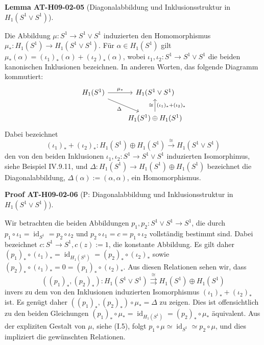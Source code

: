 \documentclass[10pt, letterpaper]{article}
\newcommand{\CustomHeading}[3]{%
  \par\medskip\noindent%
  \textbf{#1 #2} \textnormal{(#3)}.\enskip%
}
\newenvironment{LEM}[2]{\CustomHeading{Lemma}{#1}{#2}}{}
\newenvironment{PROOF}[2]{\CustomHeading{Proof}{#1}{#2}}{}
\begin{document}
\begin{LEM}{AT-H09-02-05}{Diagonalabbildung und Inklusionsstruktur in $H_1\left(S^1 \vee S^1\right)$}
Die Abbildung $\mu: S^1 \longrightarrow S^1 \vee S^1$ induzierten den Homomorphismus $\mu_*: H_1(S^1) \longrightarrow H_1(S^1 \vee S^1)$. Für $\alpha \in H_1\left(S^1\right)$ gilt $\mu_*(\alpha)=\left(\iota_1\right)_*(\alpha)+\left(\iota_2\right)_*(\alpha)$, wobei $\iota_1, \iota_2: S^1 \rightarrow S^1 \vee S^1$ die beiden kanonischen Inklusionen bezeichnen. In anderen Worten, das folgende Diagramm kommutiert:
\[
\begin{tikzcd}
H_1(S^1) \arrow[r, "\mu_*"] \arrow[dr, "\Delta"'] & H_1(S^1 \vee S^1) \\
& H_1(S^1) \oplus H_1(S^1) \arrow[u, "(\iota_1)_* + (\iota_2)_*"', "\cong"]
\end{tikzcd}
\]
Dabei bezeichnet 
$$\left(\iota_1\right)_*+\left(\iota_2\right)_*: H_1\left(S^1\right) \oplus H_1\left(S^1\right) \stackrel{\cong}{\rightarrow} H_1\left(S^1 \vee S^1\right)$$ 
den von den beiden Inklusionen $\iota_1, \iota_2: S^1 \rightarrow S^1 \vee S^1$ induzierten Isomorphimus, siehe Beispiel IV.9.11, und $\Delta: H_1\left(S^1\right) \rightarrow H_1\left(S^1\right) \oplus H_1\left(S^1\right)$ bezeichnet die Diagonalabbildung, $\Delta(\alpha):=(\alpha, \alpha)$, ein Homomorphismus.
\end{LEM}

\begin{PROOF}{AT-H09-02-06}{P: Diagonalabbildung und Inklusionsstruktur in $H_1\left(S^1 \vee S^1\right)$}
Wir betrachten die beiden Abbildungen $p_1, p_2: S^1 \vee S^1 \rightarrow S^1$, die durch $p_1 \circ \iota_1=\operatorname{id}_{S^1}=p_2 \circ \iota_2$ und $p_2 \circ \iota_1=c=p_1 \circ \iota_2$ vollständig bestimmt sind. Dabei bezeichnet $c: S^1 \rightarrow S^1, c(z):=1$, die konstante Abbildung. Es gilt daher $\left(p_1\right)_* \circ\left(\iota_1\right)_*=\operatorname{id}_{H_1\left(S^1\right)}=\left(p_2\right)_* \circ\left(\iota_2\right)_*$ sowie $\left(p_2\right)_* \circ\left(\iota_1\right)_*=0=\left(p_1\right)_* \circ\left(\iota_2\right)_*$. Aus diesen Relationen sehen wir, dass
$$
\left(\left(p_1\right)_*,\left(p_2\right)_*\right): H_1\left(S^1 \vee S^1\right) \stackrel{\cong}{\rightrightarrows} H_1\left(S^1\right) \oplus H_1\left(S^1\right)
$$
invers zu dem von den Inklusionen induzierten Isomorphismus $\left(\iota_1\right)_*+\left(\iota_2\right)_*$ ist. Es genügt daher $\left(\left(p_1\right)_*,\left(p_2\right)_*\right) \circ \mu_*=\Delta$ zu zeigen. Dies ist offensichtlich zu den beiden Gleichungen $\left(p_1\right)_* \circ \mu_*=\operatorname{id}_{H_1\left(S^1\right)}=\left(p_2\right)_* \circ \mu_*$ äquivalent. Aus der expliziten Gestalt von $\mu$, siehe (I.5), folgt $p_1 \circ \mu \simeq \operatorname{id}_{S^1} \simeq p_2 \circ \mu$, und dies impliziert die gewünschten Relationen.
\end{PROOF}
\end{document}
